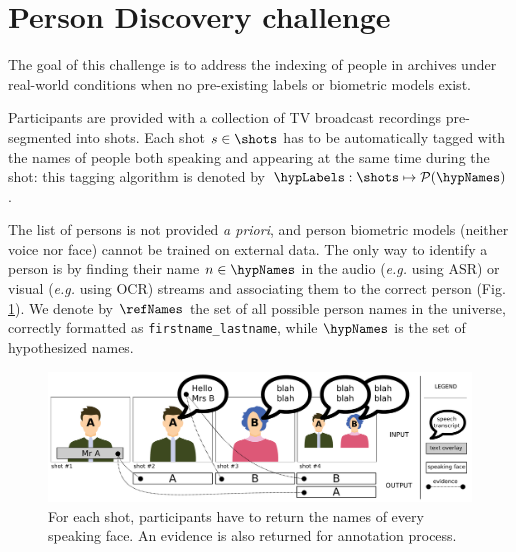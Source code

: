 \section{Person Discovery challenge}
\label{sec:challenge}


The goal of this challenge is to address the indexing of people in archives under real-world conditions when no pre-existing labels or biometric models exist.

 Participants are provided with a collection of TV broadcast recordings pre-segmented into shots.
Each shot $s \in \shots$ has to be automatically tagged with the names of people both speaking and appearing at the same time during the shot: this tagging algorithm is denoted by $\hypLabels : \shots \mapsto \mathcal{P}(\hypNames)$.

The list of persons is not provided \emph{a priori}, and person biometric models (neither voice nor face) cannot be trained on external data. 
The only way to identify a person is by finding their name $n \in \hypNames$ in the audio (\emph{e.g.} using ASR) or visual (\emph{e.g.} using OCR) streams and associating them to the correct person (Fig. \ref{fig:evidence}). %
We denote by $\refNames$ the set of all possible person names in the universe, correctly formatted as \texttt{firstname\_lastname}, while $\hypNames$ is the set of hypothesized names.

\begin{figure}[tb]
 \centering
 \includegraphics[width=1.\linewidth]{evidence.pdf}
\vspace*{-5mm}
 \caption{For each shot, participants have to return the names of every speaking face. An evidence is also returned for annotation process.}
\vspace*{-3mm}
 \label{fig:evidence}
\end{figure}

